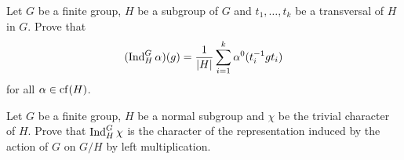 \begin{exercise}
\label{xca:useful_Ind}
    Let $G$ be a finite group, $H$ be a subgroup
    of $G$ and $t_1,\dots,t_k$ be a transversal
    of $H$ in $G$. Prove that
    \[
    (\operatorname{Ind}_H^G\alpha)(g)=\frac{1}{|H|}\sum_{i=1}^k\alpha^0(t_i^{-1}gt_i)
    \]
    for all $\alpha\in\operatorname{cf}(H)$.
\end{exercise}

\begin{exercise}
\label{xca:induction_G/H}
    Let $G$ be a finite group, $H$ be a normal
    subgroup and $\chi$ be the trivial
    character of $H$. Prove that
    $\operatorname{Ind}_H^G\chi$ is the character of the
    representation induced by the action of $G$ on $G/H$ by left multiplication. 
\end{exercise}


